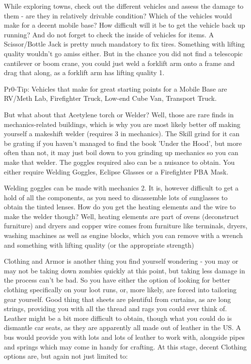\documentclass[11pt]{report}
\begin{document}
While exploring towns, check out the different vehicles and assess the damage to them - are they in relatively drivable condition? Which of the vehicles would make for a decent mobile base? How difficult will it be to get the vehicle back up running? And do not forget to check the inside of vehicles for items. A Scissor/Bottle Jack is pretty much mandatory to fix tires. Something with lifting quality wouldn't go amiss either. But in the chance you did not find a telescopic cantilever or boom crane, you could just weld a forklift arm onto a frame and drag that along, as a forklift arm has lifting quality 1.

Pr0-Tip: Vehicles that make for great starting points for a Mobile Base are RV/Meth Lab, Firefighter Truck, Low-end Cube Van, Transport Truck.

But what about that Acetylene torch or Welder? Well, those are rare finds in mechanics-related buildings, which is why you are most likely better off making yourself a makeshift welder (requires 3 in mechanics). The Skill grind for it can be grating if you haven't managed to find the book 'Under the Hood', but more often than not, it may just boil down to you grinding up mechanics so you can make that welder. The goggles required also can be a nuisance to obtain. You either require Welding Goggles, Eclipse Glasses or a Firefighter PBA Mask.

Welding goggles can be made with mechanics 2. It is, however difficult to get a hold of all the components, as you need to disassemble lots of sunglasses to obtain the tinted lenses. How do you get the heating elements and the wire to make the welder though? Well, heating elements are part of ovens (deconstruct furniture) and dryers and copper wire comes from furniture like terminals, dryers, washing machines as well as engine blocks, which you can remove with a wrench and something with lifting quality (or the appropriate strength)

Clothing and Armor is another thing you find yourself wondering - you may or may not be taking down zombies quickly at this point, but taking less damage in the process can't be bad. So you have either the option of looking for better clothing specifically on your loot runs, or, more likely, are forced into tailoring gear yourself. Good thing that sheets are plentiful from curtains, as are long strings, providing you with all the thread and rags you could ever think of. Leather might be a bit more difficult to obtain, though what you could do is dismantle car seats, as they are apparently all made out of leather in the US. A bus would provide you with lots and lots of leather to work with, alongside pipes and springs which may come in handy for crafting. At this stage, decent Clothing options are, but again not just limited to:
\end{document}

